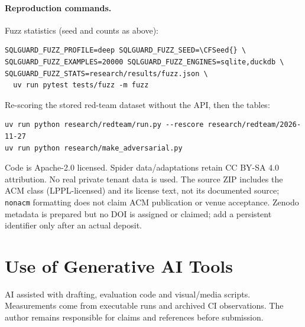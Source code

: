 \documentclass[sigconf,nonacm,natbib=false]{acmart}
\begin{document}
\paragraph{Reproduction commands.} Fuzz statistics (seed and counts as above):
\begin{lstlisting}
SQLGUARD_FUZZ_PROFILE=deep SQLGUARD_FUZZ_SEED=\CFSeed{} \
SQLGUARD_FUZZ_EXAMPLES=20000 SQLGUARD_FUZZ_ENGINES=sqlite,duckdb \
SQLGUARD_FUZZ_STATS=research/results/fuzz.json \
  uv run pytest tests/fuzz -m fuzz
\end{lstlisting}
Re-scoring the stored red-team dataset without the API, then the tables:
\begin{lstlisting}
uv run python research/redteam/run.py --rescore research/redteam/2026-11-27
uv run python research/make_adversarial.py
\end{lstlisting}

Code is Apache-2.0 licensed. Spider data/adaptations retain CC BY-SA 4.0
attribution. No real private tenant data is used. The source ZIP includes
the ACM class (LPPL-licensed) and its license text, not its documented source; \texttt{nonacm} formatting does not
claim ACM publication or venue acceptance. Zenodo metadata is prepared but
no DOI is assigned or claimed; add a persistent identifier only after an
actual deposit.

\section*{Use of Generative AI Tools}
AI assisted with drafting, evaluation code and visual/media scripts.
Measurements come from executable runs and archived CI observations. The
author remains responsible for claims and references before submission.
\end{document}
